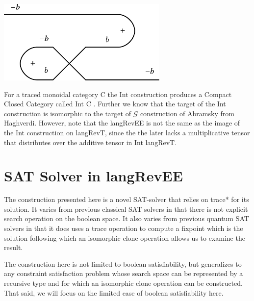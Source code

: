\documentclass[preprint]{sigplanconf}
\newcommand{\G}{\ensuremath{\mathcal{G}}\xspace}
\begin{document}
{\begin{itemize}
\begin{center}
  \includegraphics{diagrams/neg_circuit2.pdf}
\end{center}

\end{itemize}

For a traced monoidal category {{C}} the Int construction produces a
Compact Closed Category called Int {{C}} \cite{joyal1996traced}.
Further we know that the target of the Int construction is isomorphic
to the target of \G construction of Abramsky \cite{Abramsky96:0} from
Haghverdi. However, note that the {{langRevEE}} is not the same as the
image of the Int construction on {{langRevT}}, since the the later
lacks a multiplicative tensor that distributes over the additive tensor
in Int {{langRevT}}.

\section{SAT Solver in {{langRevEE}} }
\label{sec:prog}

\label{sec:sat-solver}

The construction presented here is a novel SAT-solver that relies on
{{trace*}} for its solution. It varies from previous classical SAT
solvers in that there is not explicit search operation on the boolean
space. It also varies from previous quantum SAT solvers in that it
does uses a {{trace}} operation to compute a fixpoint which is the
solution following which an isomorphic clone operation allows us to
examine the result.

The construction here is not limited to boolean satisfiability, but
generalizes to any constraint satisfaction problem whose search space
can be represented by a recursive type and for which an isomorphic
clone operation can be constructed. That said, we will focus on the
limited case of boolean satisfiability here. 

}
\end{document}
